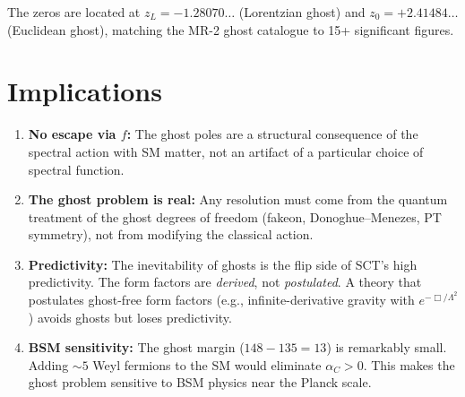 \documentclass[11pt,a4paper]{article}
\begin{document}
The zeros are located at $z_L = -1.28070\ldots$ (Lorentzian ghost)
and $z_0 = +2.41484\ldots$ (Euclidean ghost), matching the MR-2 ghost
catalogue to 15+ significant figures.


\section{Implications}

\begin{enumerate}
  \item \textbf{No escape via $f$:} The ghost poles are a structural
    consequence of the spectral action with SM matter, not an artifact
    of a particular choice of spectral function.

  \item \textbf{The ghost problem is real:} Any resolution must come
    from the quantum treatment of the ghost degrees of freedom (fakeon,
    Donoghue--Menezes, PT symmetry), not from modifying the classical
    action.

  \item \textbf{Predictivity:} The inevitability of ghosts is the
    flip side of SCT's high predictivity.  The form factors are
    \emph{derived}, not \emph{postulated}.  A theory that postulates
    ghost-free form factors (e.g., infinite-derivative gravity with
    $e^{-\Box/\Lambda^2}$) avoids ghosts but loses predictivity.

  \item \textbf{BSM sensitivity:} The ghost margin ($148 - 135 = 13$)
    is remarkably small.  Adding $\sim 5$ Weyl fermions to the SM
    would eliminate $\alpha_C > 0$.  This makes the ghost problem
    sensitive to BSM physics near the Planck scale.
\end{enumerate}
\end{document}
